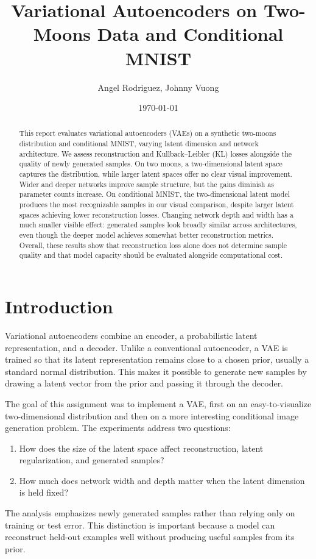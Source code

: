 \documentclass[11pt]{article}
\title{Variational Autoencoders on Two-Moons Data and Conditional MNIST}
\author{Angel Rodriguez, Johnny Vuong}
\date{\today}
\begin{document}
\maketitle

\begin{abstract}
This report evaluates variational autoencoders (VAEs) on a synthetic two-moons distribution and conditional MNIST, varying latent dimension and network architecture. We assess reconstruction and Kullback--Leibler (KL) losses alongside the quality of newly generated samples. On two moons, a two-dimensional latent space captures the distribution, while larger latent spaces offer no clear visual improvement. Wider and deeper networks improve sample structure, but the gains diminish as parameter counts increase. On conditional MNIST, the two-dimensional latent model produces the most recognizable samples in our visual comparison, despite larger latent spaces achieving lower reconstruction losses. Changing network depth and width has a much smaller visible effect: generated samples look broadly similar across architectures, even though the deeper model achieves somewhat better reconstruction metrics. Overall, these results show that reconstruction loss alone does not determine sample quality and that model capacity should be evaluated alongside computational cost.
\end{abstract}

\section{Introduction}

Variational autoencoders combine an encoder, a probabilistic latent
representation, and a decoder. Unlike a conventional autoencoder, a VAE is
trained so that its latent representation remains close to a chosen prior,
usually a standard normal distribution. This makes it possible to generate new
samples by drawing a latent vector from the prior and passing it through the
decoder.

The goal of this assignment was to implement a VAE, first on an easy-to-visualize
two-dimensional distribution and then on a more interesting conditional image
generation problem. The experiments address two questions:
\begin{enumerate}
    \item How does the size of the latent space affect reconstruction, latent
    regularization, and generated samples?
    \item How much does network width and depth matter when the latent dimension
    is held fixed?
\end{enumerate}
The analysis emphasizes newly generated samples rather than relying only on
training or test error. This distinction is important because a model can
reconstruct held-out examples well without producing useful samples from its
prior.
\end{document}
